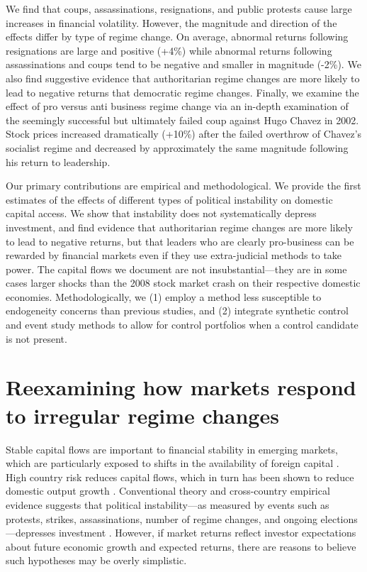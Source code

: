 \documentclass[12pt,final,fleqn]{article}
\theoremstyle{plain}
\begin{document}
We find that coups, assassinations, resignations, and public protests cause large increases in financial volatility. However, the magnitude and direction of the effects differ by type of regime change. On average, abnormal returns following resignations are large and positive (+4\%) while abnormal returns following assassinations and coups tend to be negative and smaller in magnitude (-2\%). We also find suggestive evidence that authoritarian regime changes are more likely to lead to negative returns that democratic regime changes. Finally, we examine the effect of pro versus anti business regime change via an in-depth examination of the seemingly successful but ultimately failed coup against Hugo Chavez in 2002. Stock prices increased dramatically (+10\%) after the failed overthrow of Chavez's socialist regime and decreased by approximately the same magnitude following his return to leadership.

Our primary contributions are empirical and methodological. We provide the first estimates of the effects of different types of political instability on domestic capital access. We show that instability does not systematically depress investment, and find evidence that authoritarian regime changes are more likely to lead to negative returns, but that leaders who are clearly pro-business can be rewarded by financial markets even if they use extra-judicial methods to take power. The capital flows we document are not insubstantial---they are in some cases larger shocks than the 2008 stock market crash on their respective domestic economies. Methodologically, we (1) employ a method less susceptible to endogeneity concerns than previous studies, and (2) integrate synthetic control and event study methods to allow for control portfolios when a control candidate is not present.

\singlespacing
\section{Reexamining how markets respond to irregular regime changes}
\doublespacing

Stable capital flows are important to financial stability in emerging markets, which are particularly exposed to shifts in the availability of foreign capital \citep{koepke2019drives, obstfeld2012financial, cohen2017global}. High country risk reduces capital flows, which in turn has been shown to reduce domestic output growth \citep{koepke2019drives}. Conventional theory and cross-country empirical evidence suggests that political instability---as measured by events such as protests, strikes, assassinations, number of regime changes, and ongoing elections---depresses investment \citep{irshad2017relationship, le2006political, lensink2000capital, boutchkova2012precarious, lehkonen2015democracy}. However, if market returns reflect investor expectations about future economic growth and expected returns, there are reasons to believe such hypotheses may be overly simplistic. 
\end{document}
